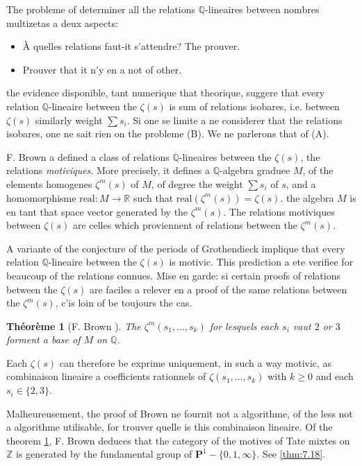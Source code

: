 \documentclass[11pt,a4paper]{article}
\theoremstyle{plain}
\newtheorem{theorem}{Th\'eor\`eme}
\theoremstyle{definition}
\newcommand{\Z}{\mathbb{Z}}
\newcommand{\Q}{\mathbb{Q}}
\newcommand{\R}{\mathbb{R}}
\begin{document}
The probleme of determiner all the relations $\Q$-lineaires between nombres multizetas a deux aspects:
\begin{itemize}
\item[(A)] \`A quelles relations faut-it s'attendre? The prouver.
\item[(B)] Prouver that it n'y en a not of other.
\end{itemize}

the evidence disponible, tant numerique that theorique, suggere that every relation $\Q$-lineaire between the $\zeta(s)$ is sum of relations isobares, i.e. between $\zeta(s)$ similarly weight $\sum s_i$. Si one se limite a ne considerer that the relations isobares, one ne sait rien on the probleme (B). We ne parlerons that of (A).

F. Brown a defined a class of relations $\Q$-lineaires between the $\zeta(s)$, the relations \emph{motiviques}. More precisely, it defines a $\Q$-algebra graduee $M$, of the elements homogenes $\zeta^m(s)$ of $M$, of degree the weight $\sum s_i$ of $s$, and a homomorphisme $\mathrm{real} : M \to \R$ such that $\mathrm{real}(\zeta^m(s)) = \zeta(s)$. the algebra $M$ is en tant that space vector generated by the $\zeta^m(s)$. The relations motiviques between $\zeta(s)$ are celles which proviennent of relations between the $\zeta^m(s)$.

A variante of the conjecture of the periods of Grothendieck implique that every relation $\Q$-lineaire between the $\zeta(s)$ is motivic. This prediction a ete verifiee for beaucoup of the relations connues. Mise en garde: si certain proofs of relations between the $\zeta(s)$ are faciles a relever en a proof of the same relations between the $\zeta^m(s)$, c'is loin of be toujours the cas.

\begin{theorem}[F. Brown {\cite{Brown}}]\label{thm:0.2}
The $\zeta^m(s_1,\ldots,s_k)$ for lesquels each $s_i$ vaut $2$ or $3$ forment a base of $M$ on $\Q$.
\end{theorem}

Each $\zeta(s)$ can therefore be exprime uniquement, in such a way motivic, as combinaison lineaire a coefficients rationnels of $\zeta(s_1,\ldots,s_k)$ with $k \geq 0$ and each $s_i \in \{2,3\}$.

Malheureusement, the proof of Brown ne fournit not a algorithme, of the less not a algorithme utilisable, for trouver quelle is this combinaison lineaire. Of the theorem \ref{thm:0.2}, F. Brown deduces that the category of the motives of Tate mixtes on $\Z$ is generated by the fundamental group of $\mathbf{P}^1 - \{0,1,\infty\}$. See \ref{thm:7.18}.
\end{document}

